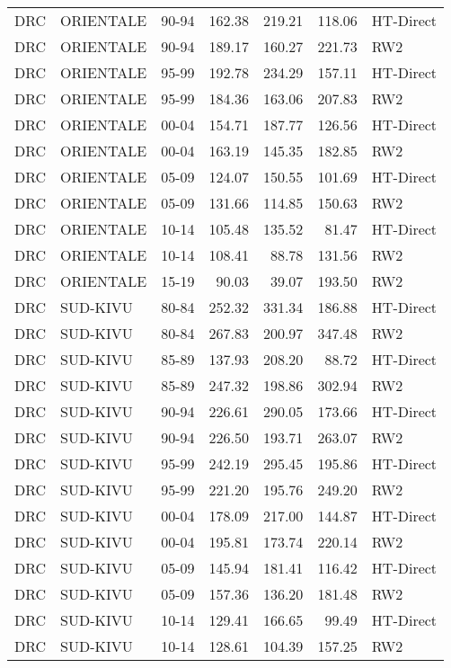 \begin{longtable}{lllrrrl}
  DRC & ORIENTALE & 90-94 & 162.38 & 219.21 & 118.06 & HT-Direct \\ 
  DRC & ORIENTALE & 90-94 & 189.17 & 160.27 & 221.73 & RW2 \\ 
  DRC & ORIENTALE & 95-99 & 192.78 & 234.29 & 157.11 & HT-Direct \\ 
  DRC & ORIENTALE & 95-99 & 184.36 & 163.06 & 207.83 & RW2 \\ 
  DRC & ORIENTALE & 00-04 & 154.71 & 187.77 & 126.56 & HT-Direct \\ 
  DRC & ORIENTALE & 00-04 & 163.19 & 145.35 & 182.85 & RW2 \\ 
  DRC & ORIENTALE & 05-09 & 124.07 & 150.55 & 101.69 & HT-Direct \\ 
  DRC & ORIENTALE & 05-09 & 131.66 & 114.85 & 150.63 & RW2 \\ 
  DRC & ORIENTALE & 10-14 & 105.48 & 135.52 & 81.47 & HT-Direct \\ 
  DRC & ORIENTALE & 10-14 & 108.41 & 88.78 & 131.56 & RW2 \\ 
  DRC & ORIENTALE & 15-19 & 90.03 & 39.07 & 193.50 & RW2 \\ 
  DRC & SUD-KIVU & 80-84 & 252.32 & 331.34 & 186.88 & HT-Direct \\ 
  DRC & SUD-KIVU & 80-84 & 267.83 & 200.97 & 347.48 & RW2 \\ 
  DRC & SUD-KIVU & 85-89 & 137.93 & 208.20 & 88.72 & HT-Direct \\ 
  DRC & SUD-KIVU & 85-89 & 247.32 & 198.86 & 302.94 & RW2 \\ 
  DRC & SUD-KIVU & 90-94 & 226.61 & 290.05 & 173.66 & HT-Direct \\ 
  DRC & SUD-KIVU & 90-94 & 226.50 & 193.71 & 263.07 & RW2 \\ 
  DRC & SUD-KIVU & 95-99 & 242.19 & 295.45 & 195.86 & HT-Direct \\ 
  DRC & SUD-KIVU & 95-99 & 221.20 & 195.76 & 249.20 & RW2 \\ 
  DRC & SUD-KIVU & 00-04 & 178.09 & 217.00 & 144.87 & HT-Direct \\ 
  DRC & SUD-KIVU & 00-04 & 195.81 & 173.74 & 220.14 & RW2 \\ 
  DRC & SUD-KIVU & 05-09 & 145.94 & 181.41 & 116.42 & HT-Direct \\ 
  DRC & SUD-KIVU & 05-09 & 157.36 & 136.20 & 181.48 & RW2 \\ 
  DRC & SUD-KIVU & 10-14 & 129.41 & 166.65 & 99.49 & HT-Direct \\ 
  DRC & SUD-KIVU & 10-14 & 128.61 & 104.39 & 157.25 & RW2 \\ 

\end{longtable}

